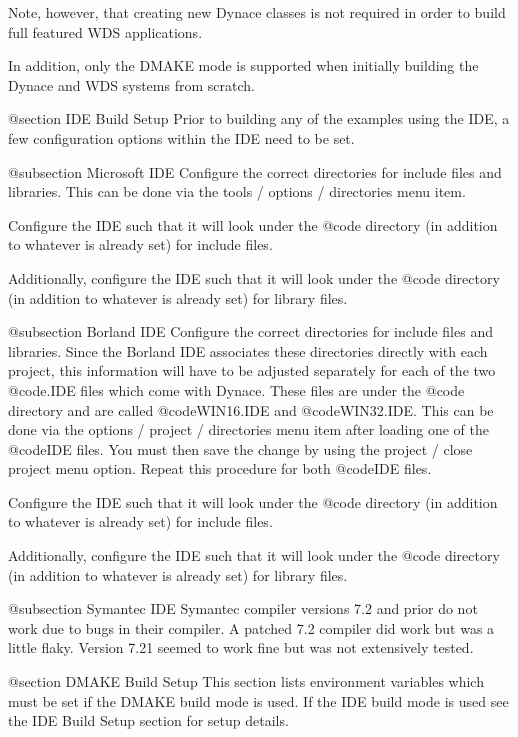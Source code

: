 Note, however, that creating new Dynace classes is not required in
order to build full featured WDS applications.

In addition, only the DMAKE mode is supported when initially building
the Dynace and WDS systems from scratch.


@section IDE Build Setup
Prior to building any of the examples using the IDE, a few configuration
options within the IDE need to be set.

@subsection Microsoft IDE
Configure the correct directories for include files and libraries.
This can be done via the tools / options / directories menu item.

Configure the IDE such that it will look under the
@code{\DYNACE\INCLUDE} directory (in addition to whatever is already
set) for include files.

Additionally, configure the IDE such that it
will look under the @code{\DYNACE\LIB} directory (in addition to
whatever is already set) for library files.


@subsection Borland IDE
Configure the correct directories for include files and libraries.
Since the Borland IDE associates these directories directly with
each project, this information will have to be adjusted separately
for each of the two @code{.IDE} files which come with Dynace.
These files are under the @code{\DYNACE\WINEXAM\SETUP} directory
and are called @code{WIN16.IDE} and @code{WIN32.IDE}.
This can be done via the options / project / directories menu item
after loading one of the @code{IDE} files.  You must then save the
change by using the project / close project menu option.  Repeat this
procedure for both @code{IDE} files.

Configure the IDE such that it will look under the
@code{\DYNACE\INCLUDE} directory (in addition to whatever is already
set) for include files.

Additionally, configure the IDE such that it will look under the
@code{\DYNACE\LIB} directory (in addition to whatever is already set)
for library files.

@subsection Symantec IDE
Symantec compiler versions 7.2 and prior do not work due to bugs in
their compiler.  A patched 7.2 compiler did work but was a little
flaky.  Version 7.21 seemed to work fine but was not extensively
tested.

@section DMAKE Build Setup
This section lists environment variables which must be set if the
DMAKE build mode is used.  If the IDE build mode is used
see the IDE Build Setup section for setup details.

